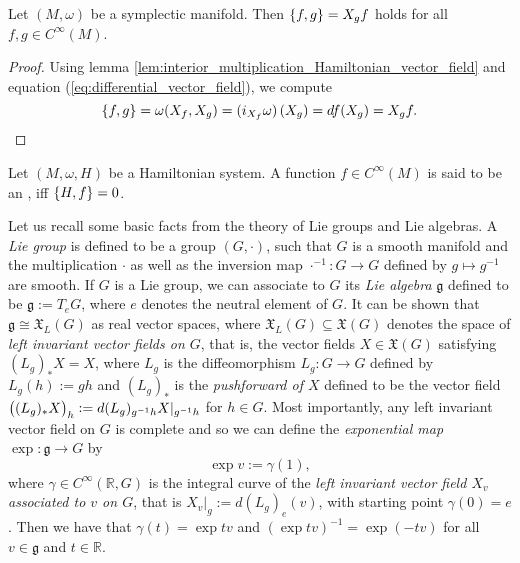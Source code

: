 \begin{lemma}
	Let $(M,\omega)$ be a symplectic manifold. Then $\cbr{f,g} = X_gf$ holds for all $f,g \in C^\infty(M)$.
\end{lemma}

\begin{proof}
	Using lemma \ref{lem:interior_multiplication_Hamiltonian_vector_field} and equation (\ref{eq:differential_vector_field}), we compute
	\begin{equation*}
		\cbr{f,g} = \omega(X_f,X_g) = \del[0]{i_{X_f}\omega}(X_g) = df(X_g) = X_g f.
	\end{equation*}
\end{proof}

\begin{definition}
	Let $(M,\omega,H)$ be a Hamiltonian system. A function $f \in C^\infty(M)$ is said to be an , iff $\cbr{H,f} = 0$.
\end{definition}

Let us recall some basic facts from the theory of Lie groups and Lie algebras. A \emph{Lie group} is defined to be a group $(G,\cdot)$, such that $G$ is a smooth manifold and the multiplication $\cdot$ as well as the inversion map $\cdot^{-1} : G \to G$ defined by $g\mapsto g^{-1}$ are smooth. If $G$ is a Lie group, we can associate to $G$ its \emph{Lie algebra} $\mathfrak{g}$ defined to be $\mathfrak{g} := T_eG$, where $e$ denotes the neutral element of $G$. It can be shown that $\mathfrak{g} \cong \mathfrak{X}_L(G)$ as real vector spaces, where $\mathfrak{X}_L(G) \subseteq \mathfrak{X}(G)$ denotes the space of \emph{left invariant vector fields on $G$}, that is, the vector fields $X \in \mathfrak{X}(G)$ satisfying $(L_g)_* X = X$, where $L_g$ is the diffeomorphism $L_g : G \to G$ defined by $L_g(h) := gh$ and $(L_g)_*$ is the \emph{pushforward of $X$} defined to be the vector field $\del[1]{(L_g)_*X}_h := d(L_g)_{g^{-1}h}X\vert_{g^{-1}h}$ for $h \in G$. Most importantly, any left invariant vector field on $G$ is complete and so we can define the \emph{exponential map} $\exp : \mathfrak{g} \to G$ by 
\begin{equation*}
	\exp v := \gamma(1),
\end{equation*}
\noindent where $\gamma \in C^\infty(\mathbb{R},G)$ is the integral curve of the \emph{left invariant vector field $X_v$ associated to $v$ on $G$}, that is $X_v\vert_g := d(L_g)_e(v)$, with starting point $\gamma(0) = e$. Then we have that $\gamma(t) = \exp tv$ and $(\exp tv)^{-1} = \exp (-tv)$ for all $v \in \mathfrak{g}$ and $t \in \mathbb{R}$.

